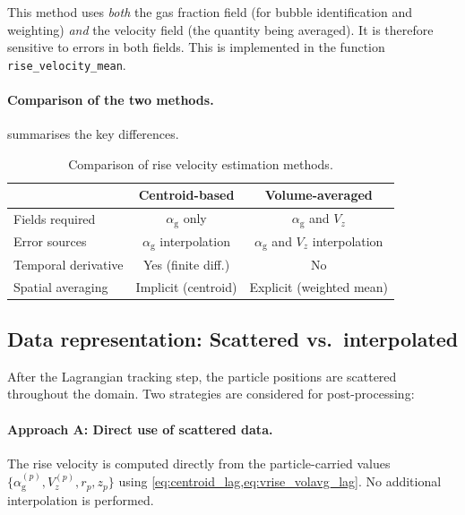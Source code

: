 \documentclass[11pt,a4paper]{article}
\newcommand{\alphag}{\alpha_{\mathrm{g}}}
\newcommand{\Vz}{V_z}
\begin{document}
This method uses \emph{both} the gas fraction field (for bubble
identification and weighting) \emph{and} the velocity field (the quantity
being averaged).  It is therefore sensitive to errors in both fields.  This
is implemented in the function \texttt{rise\_velocity\_mean}.

\paragraph{Comparison of the two methods.}
 summarises the key differences.
\begin{table}[h]
\centering
\caption{Comparison of rise velocity estimation methods.}
\label{tab:method_comparison}
\begin{tabular}{lcc}
  \toprule
  & \textbf{Centroid-based} & \textbf{Volume-averaged} \\
  \midrule
  Fields required & $\alphag$ only & $\alphag$ and $\Vz$ \\
  Error sources   & $\alphag$ interpolation & $\alphag$ and $\Vz$ interpolation \\
  Temporal derivative & Yes (finite diff.) & No \\
  Spatial averaging & Implicit (centroid) & Explicit (weighted mean) \\
  \bottomrule
\end{tabular}
\end{table}


\subsection{Data representation: Scattered vs.\ interpolated}
\label{sec:data_repr}

After the Lagrangian tracking step, the particle positions are scattered
throughout the domain.  Two strategies are considered for post-processing:

\paragraph{Approach A: Direct use of scattered data.}
The rise velocity is computed directly from the particle-carried values
$\{\alphag^{(p)}, \Vz^{(p)}, r_p, z_p\}$ using
\cref{eq:centroid_lag,eq:vrise_volavg_lag}.  No additional interpolation is
performed.
\end{document}
